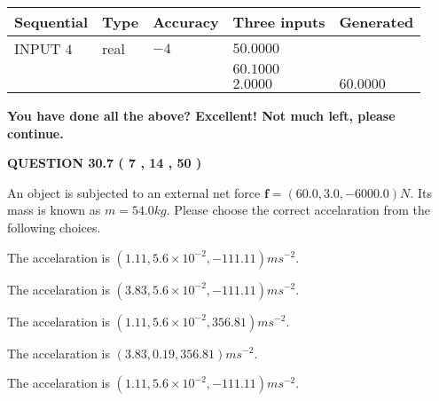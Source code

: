 \documentclass[12pt]{article}
\begin{document}
   
  
  
\noindent\begin{tabular}{|l|l|l|l|l|}
\hline
 Sequential & Type & Accuracy & Three inputs & Generated \\ 
\hline
 
 
  INPUT $            4 $ & real & $           -4  $ & $
 50.0000
  $ & \\
  & & &  $
 60.1000
  $ & \\
  & & &  $
 2.0000
 $ & $ 60.0000 $ 
 \\  \hline  
 \end{tabular}
   
   
   
   
\vspace{0.3in}
{\textbf{\LARGE{You have done all the above? Excellent! Not much left, please continue.}}}
\vspace{0.3in}
   
   
  
\vspace{0.2in}
  
{\textbf{\Large{QUESTION
30.7 
 (           7 ,          14 ,          50 )
}}}
  
  
 
An object is subjected to an external net force $\mathbf{f}=
(60.0 , 3.0 , -6000.0) N$.
Its mass is known as $m= %
54.0 kg$.
Please choose the correct accelaration from the following choices.
 
 
  The accelaration is $  %
(
1.11,
5.6 \times 10^{-2},
-111.11)
ms^{-2} $.
 
 
  The accelaration is $  %
(
3.83,
5.6 \times 10^{-2},
-111.11)
ms^{-2} $.
 
 
  The accelaration is $  %
(
1.11,
5.6 \times 10^{-2},
356.81)
ms^{-2} $.
 
 
  The accelaration is $  %
(
3.83,
0.19,
356.81)
ms^{-2} $.
 
 
\noindent{}
 
 
  The accelaration is $  %
(
1.11,
5.6 \times 10^{-2},
-111.11)
ms^{-2} $.
 
 
\noindent{}
 
 
 
 
 
\end{document}
